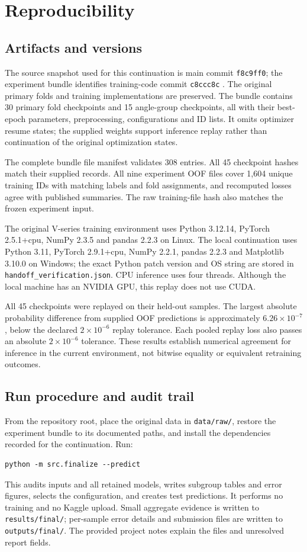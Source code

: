 \documentclass[journal]{IEEEtran}
\begin{document}
\section{Reproducibility}
\subsection{Artifacts and versions}
The source snapshot used for this continuation is main commit \texttt{f8c9ff0}; the experiment bundle identifies training-code commit \texttt{c8ccc8c} \cite{repo}. The original primary folds and training implementations are preserved. The bundle contains 30 primary fold checkpoints and 15 angle-group checkpoints, all with their best-epoch parameters, preprocessing, configurations and ID lists. It omits optimizer resume states; the supplied weights support inference replay rather than continuation of the original optimization states.

The complete bundle file manifest validates 308 entries. All 45 checkpoint hashes match their supplied records. All nine experiment OOF files cover 1,604 unique training IDs with matching labels and fold assignments, and recomputed losses agree with published summaries. The raw training-file hash also matches the frozen experiment input.

The original V-series training environment uses Python 3.12.14, PyTorch 2.5.1+cpu, NumPy 2.3.5 and pandas 2.2.3 on Linux. The local continuation uses Python 3.11, PyTorch 2.9.1+cpu, NumPy 2.2.1, pandas 2.2.3 and Matplotlib 3.10.0 on Windows; the exact Python patch version and OS string are stored in \texttt{handoff\_verification.json}. CPU inference uses four threads. Although the local machine has an NVIDIA GPU, this replay does not use CUDA.

All 45 checkpoints were replayed on their held-out samples. The largest absolute probability difference from supplied OOF predictions is approximately $6.26\times10^{-7}$, below the declared $2\times10^{-6}$ replay tolerance. Each pooled replay loss also passes an absolute $2\times10^{-6}$ tolerance. These results establish numerical agreement for inference in the current environment, not bitwise equality or equivalent retraining outcomes.

\subsection{Run procedure and audit trail}
From the repository root, place the original data in \texttt{data/raw/}, restore the experiment bundle to its documented paths, and install the dependencies recorded for the continuation. Run:
\begin{verbatim}
python -m src.finalize --predict
\end{verbatim}
This audits inputs and all retained models, writes subgroup tables and error figures, selects the configuration, and creates test predictions. It performs no training and no Kaggle upload. Small aggregate evidence is written to \texttt{results/final/}; per-sample error details and submission files are written to \texttt{outputs/final/}. The provided project notes explain the files and unresolved report fields.
\end{document}
